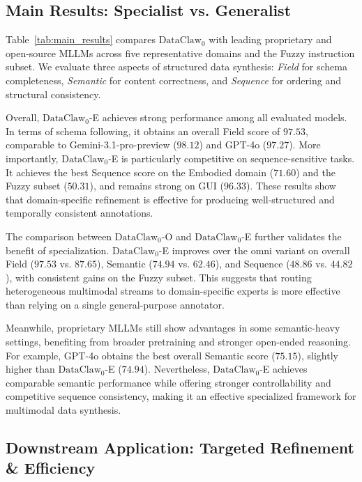 \documentclass{llmxive}
\begin{document}
\subsection{Main Results: Specialist vs. Generalist}
\label{subsec:main_results}

Table~\ref{tab:main_results} compares $\text{DataClaw}_0$ with leading proprietary and open-source MLLMs across five representative domains and the Fuzzy instruction subset. We evaluate three aspects of structured data synthesis: \textit{Field} for schema completeness, \textit{Semantic} for content correctness, and \textit{Sequence} for ordering and structural consistency.

Overall, $\text{DataClaw}_0$-E achieves strong performance among all evaluated models. In terms of schema following, it obtains an overall Field score of \(97.53\), comparable to Gemini-3.1-pro-preview (\(98.12\)) and GPT-4o (\(97.27\)). More importantly, $\text{DataClaw}_0$-E is particularly competitive on sequence-sensitive tasks. It achieves the best Sequence score on the Embodied domain (\(71.60\)) and the Fuzzy subset (\(50.31\)), and remains strong on GUI (\(96.33\)). These results show that domain-specific refinement is effective for producing well-structured and temporally consistent annotations.

The comparison between $\text{DataClaw}_0$-O and $\text{DataClaw}_0$-E further validates the benefit of specialization. $\text{DataClaw}_0$-E improves over the omni variant on overall Field (\(97.53\) vs. \(87.65\)), Semantic (\(74.94\) vs. \(62.46\)), and Sequence (\(48.86\) vs. \(44.82\)), with consistent gains on the Fuzzy subset. This suggests that routing heterogeneous multimodal streams to domain-specific experts is more effective than relying on a single general-purpose annotator.

Meanwhile, proprietary MLLMs still show advantages in some semantic-heavy settings, benefiting from broader pretraining and stronger open-ended reasoning. For example, GPT-4o obtains the best overall Semantic score (\(75.15\)), slightly higher than $\text{DataClaw}_0$-E (\(74.94\)). Nevertheless, $\text{DataClaw}_0$-E achieves comparable semantic performance while offering stronger controllability and competitive sequence consistency, making it an effective specialized framework for multimodal data synthesis.




\subsection{Downstream Application: Targeted Refinement \& Efficiency }
\label{sec:downstream_application}
\end{document}
